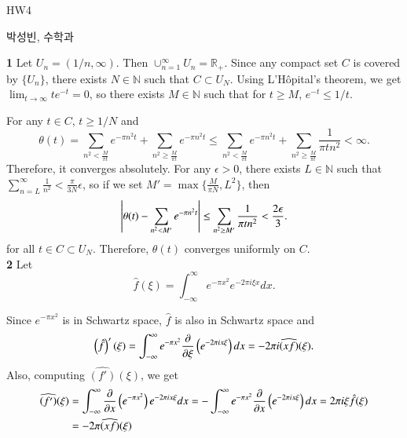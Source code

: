\documentclass[a4paper, 12pt]{article}
\theoremstyle{Mydefinition}
\theoremstyle{Mytheorem}
\begin{document}
\thispagestyle{myfirstpage}
\begin{center}
	\Large{HW4}
\end{center}
박성빈, 수학과

\noindent \textbf{1}
Let $U_n = (1/n, \infty)$. Then $\cup_{n=1}^\infty U_n = \mathbb{R}_+$. Since any compact set $C$ is covered by $\{U_n\}$, there exists $N\in\mathbb{N}$ such that $C\subset U_N$. Using L'H\^opital's theorem, we get $\lim_{t\rightarrow \infty} te^{-t} = 0$, so there exists $M\in\mathbb{N}$ such that for $t\geq M$, $e^{-t}\leq 1/t$.

For any $t\in C$, $t\geq 1/N$ and
\begin{equation}
    \theta(t) = \sum_{n^2<\frac{M}{\pi t}} e^{-\pi n^2 t} + \sum_{n^2\geq \frac{M}{\pi t}} e^{-\pi n^2 t}\leq \sum_{n^2<\frac{M}{\pi t}} e^{-\pi n^2 t} + \sum_{n^2\geq \frac{M}{\pi t}} \frac{1}{\pi tn^2}<\infty.
\end{equation}
Therefore, it converges absolutely. For any $\epsilon>0$, there exists $L\in\mathbb{N}$ such that $\sum_{n=L}^\infty \frac{1}{n^2}<\frac{\pi}{3N}\epsilon$, so if we set $M' = \max\{\frac{M}{\pi N}, L^2\}$, then
\begin{equation}
    \abs{\theta(t)-\sum_{n^2<M'} e^{-\pi n^2 t}}\leq \sum_{n^2\geq M'} \frac{1}{\pi tn^2}<\frac{2\epsilon}{3}.
\end{equation}
for all $t\in C\subset U_N$. Therefore, $\theta(t)$ converges uniformly on $C$.\\

\noindent \textbf{2}
Let
\begin{equation}
    \hat{f}(\xi) = \int_{-\infty}^\infty e^{-\pi x^2} e^{-2\pi i \xi x }dx.
\end{equation}

Since $e^{-\pi x^2}$ is in Schwartz space, $\hat{f}$ is also in Schwartz space and
\begin{equation}
    \left(\hat{f}\right)'(\xi) =  \int_{-\infty}^\infty e^{-\pi x^2} \pdv{\xi}\left(e^{-2\pi i x \xi}\right)dx = -2\pi i \widehat{\left(xf\right)}(\xi).
\end{equation}
Also, computing $\widehat{\left(f'\right)}(\xi)$, we get
\begin{equation}
\begin{split}
    \widehat{\left(f'\right)}(\xi) &= \int_{-\infty}^\infty \pdv{x}\left(e^{-\pi x^2}\right)e^{-2\pi i x \xi} dx = -\int_{-\infty}^\infty e^{-\pi x^2}\pdv{x}\left(e^{-2\pi i x \xi}\right) dx = 2\pi i \xi\hat{f}(\xi)\\
    &=-2\pi\widehat{\left(xf\right)}(\xi)
\end{split}
\end{equation}
\end{document}
